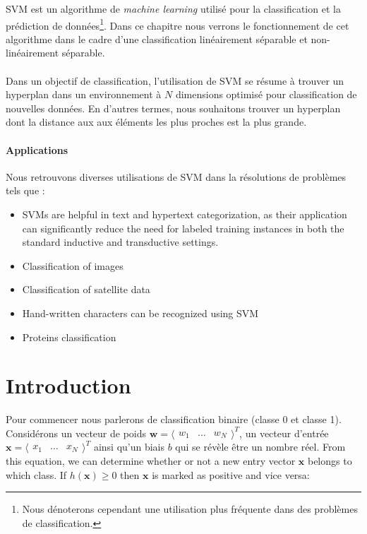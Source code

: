 \gls{SVM} est un algorithme de \textit{machine learning} utilisé pour la classification et la prédiction de données\footnote{Nous dénoterons cependant une utilisation plus fréquente dans des problèmes de classification.}. 
Dans ce chapitre nous verrons le fonctionnement de cet algorithme dans le cadre d'une classification linéairement séparable et non-linéairement séparable.

\paragraph{}

Dans un objectif de classification, l'utilisation de \gls{SVM} se résume à trouver un hyperplan dans un environnement à $N$ dimensions optimisé pour classification de nouvelles données.
En d'autres termes, nous souhaitons trouver un hyperplan dont la distance aux aux éléments les plus proches est la plus grande.

\paragraph{Applications}
Nous retrouvons diverses utilisations de \gls{SVM} dans la résolutions de problèmes tels que : 
\begin{itemize}
	\item \gls{SVM}s are helpful in text and hypertext categorization, as their application can significantly reduce the need for labeled training instances in both the standard inductive and transductive settings.
	\item Classification of images
	\item Classification of satellite data
	\item Hand-written characters can be recognized using SVM
	\item Proteins classification
\end{itemize}

\section{Introduction}

Pour commencer nous parlerons de classification binaire (classe 0 et classe 1). Considérons un vecteur de poids $\mathbf w = \langle \begin{matrix} w_1 & \dots & w_N \end{matrix} \rangle^T$, un vecteur d'entrée $\mathbf x = \langle \begin{matrix} x_1 & \dots & x_N \end{matrix} \rangle^T$ ainsi qu'un biais $b$ qui se révèle être un nombre réel.
From this equation, we can determine whether or not a new entry vector $\mathbf x$ belongs to which class.
If $h(\mathbf x) \geq 0$ then $\mathbf x$ is marked as positive and vice versa:

